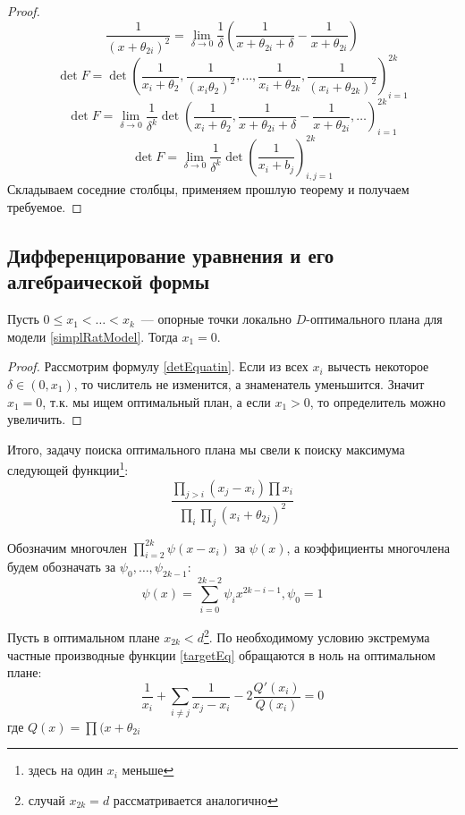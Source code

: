 \begin{proof}
$$ \frac{1}{(x + \theta_{2i})^2} = \lim\limits_{\delta \rightarrow 0} \frac{1}{\delta}\left(\frac{1}{x+\theta_{2i}+\delta} - \frac{1}{x+\theta_{2i}}\right)$$
$$\det F = \det \left(\frac{1}{x_i + \theta_2}, \frac{1}{(x_i \theta_2)^2}, …, \frac{1}{x_i+\theta_{2k}}, \frac{1}{(x_i + \theta_{2k})^2} \right)_{i=1}^{2k}$$
$$ \det F = \lim \limits_{\delta \rightarrow 0} \frac{1}{\delta^k} \det \left(\frac{1}{x_i + \theta_2}, \frac{1}{x+\theta_{2i}+\delta} - \frac{1}{x+\theta_{2i}}, … \right)_{i=1}^{2k}$$
$$\det F = \lim \limits_{\delta \rightarrow 0} \frac{1}{\delta^k}\det \left( \frac{1}{x_i + b_j} \right)_{i,j=1}^{2k}$$
Складываем соседние столбцы, применяем прошлую теорему и получаем требуемое.
\end{proof}

\subsection{Дифференцирование уравнения и его алгебраической формы}

\begin{thm}
Пусть $0 \leq x_1 < … < x_k$ — опорные точки локально $D$-оптимального плана для модели \eqref{simplRatModel}.  Тогда $x_1 = 0$.
\end{thm}
\begin{proof}
Рассмотрим формулу \eqref{detEquatin}. Если из всех $x_i$ вычесть некоторое $\delta \in (0, x_1)$, то числитель не изменится, а знаменатель уменьшится. Значит $x_1 = 0$, т.к. мы ищем оптимальный план, а если $x_1 >0$, то определитель можно увеличить.
\end{proof}

Итого, задачу поиска оптимального плана мы свели к поиску максимума следующей функции\footnote{здесь на один $x_i$ меньше}:
\begin{equation}
\label{targetEq}
\frac{\prod\limits_{j>i}(x_j - x_i) \prod x_i}{\prod\limits_i\prod\limits_j (x_i + \theta_{2j})^2}
\end{equation}

Обозначим многочлен $\prod\limits_{i=2}^{2k}\psi(x-x_i)$ за $\psi(x)$, а коэффициенты многочлена будем обозначать за $\psi_0, …, \psi_{2k-1}$:
$$\psi(x) = \sum\limits_{i=0}^{2k-2}\psi_i x^{2k-i-1}, \psi_0 = 1$$

Пусть в оптимальном плане $x_{2k} < d$\footnote{случай $x_{2k}=d$ рассматривается аналогично}. По необходимому условию экстремума частные производные   функции \eqref{targetEq} обращаются в ноль на оптимальном плане:
$$ \frac{1}{x_i} + \sum\limits_{i\neq j} \frac{1}{x_j- x_i} - 2 \frac{Q'(x_i)}{Q(x_i)} = 0$$
где $Q(x)= \prod(x+\theta_{2i}$ 

